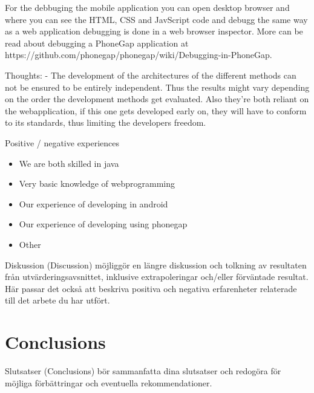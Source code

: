 \documentclass{./tex/cslthse-msc}
\begin{document}
For the debbuging the mobile application you can open desktop browser and where you can see the HTML, CSS and JavScript code and debugg the same way as a web application debugging is done in a web browser inspector. More can be read about debugging a PhoneGap application at https://github.com/phonegap/phonegap/wiki/Debugging-in-PhoneGap.  



Thoughts:
 - The development of the architectures of the different methods can not be ensured to be entirely independent. Thus the results might vary depending on the order the development methods get evaluated. Also they're both reliant on the webapplication, if this one gets developed early on, they will have to conform to its standards, thus limiting the developers freedom. 

Positive / negative experiences
\begin{itemize}
    \item We are both skilled in java
    \item Very basic knowledge of webprogramming
    \item Our experience of developing in android
    \item Our experience of developing using phonegap
    \item Other
\end{itemize}

Diskussion (Discussion) möjliggör en längre diskussion och tolkning av resultaten från utvärderingsavsnittet, inklusive extrapoleringar och/eller förväntade resultat. Här passar det också att beskriva positiva och negativa erfarenheter relaterade till det arbete du har utfört.

\chapter{Conclusions}
Slutsatser (Conclusions) bör sammanfatta dina slutsatser och redogöra för möjliga förbättringar och eventuella rekommendationer.
\end{document}
